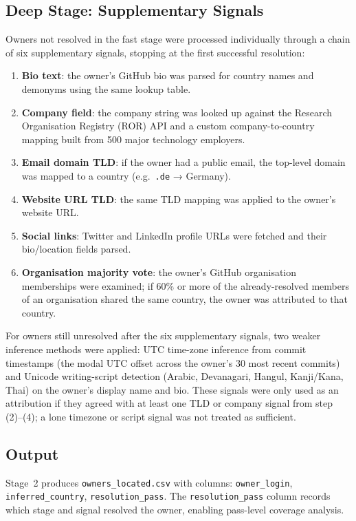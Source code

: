 \subsection{Deep Stage: Supplementary Signals}

Owners not resolved in the fast stage were processed individually through a chain of six supplementary signals, stopping at the first successful resolution:

\begin{enumerate}
  \item \textbf{Bio text}: the owner's GitHub bio was parsed for country names and demonyms using the same lookup table.
  \item \textbf{Company field}: the company string was looked up against the Research Organisation Registry (ROR) API and a custom company-to-country mapping built from 500 major technology employers.
  \item \textbf{Email domain TLD}: if the owner had a public email, the top-level domain was mapped to a country (e.g.\ \texttt{.de} → Germany).
  \item \textbf{Website URL TLD}: the same TLD mapping was applied to the owner's website URL.
  \item \textbf{Social links}: Twitter and LinkedIn profile URLs were fetched and their bio/location fields parsed.
  \item \textbf{Organisation majority vote}: the owner's GitHub organisation memberships were examined; if 60\% or more of the already-resolved members of an organisation shared the same country, the owner was attributed to that country.
\end{enumerate}

For owners still unresolved after the six supplementary signals, two weaker inference methods were applied: UTC time-zone inference from commit timestamps (the modal UTC offset across the owner's 30 most recent commits) and Unicode writing-script detection (Arabic, Devanagari, Hangul, Kanji/Kana, Thai) on the owner's display name and bio. These signals were only used as an attribution if they agreed with at least one TLD or company signal from step (2)--(4); a lone timezone or script signal was not treated as sufficient.

\subsection{Output}

Stage~2 produces \texttt{owners\_located.csv} with columns: \texttt{owner\_login}, \texttt{inferred\_country}, \texttt{resolution\_pass}. The \texttt{resolution\_pass} column records which stage and signal resolved the owner, enabling pass-level coverage analysis.

